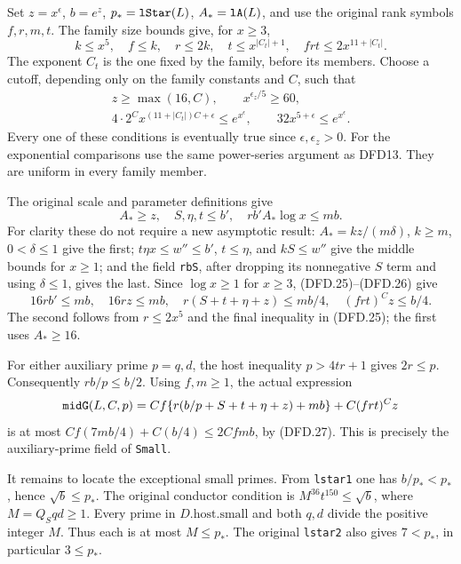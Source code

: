 \documentclass[11pt,a4paper]{article}
\numberwithin{equation}{section}
\theoremstyle{remark}\newtheorem{remark}[theorem]{Remark}
\begin{document}
Set $z=x^\epsilon$, $b=e^z$, $p_*=\texttt{l\allowbreak Star}(L)$,
$A_*=\texttt{l\allowbreak A}(L)$, and use the original rank symbols
$f,r,m,t$. The family size bounds give, for $x\ge3$,
\[
 k\le x^5,\quad f\le k,\quad r\le2k,
 \quad t\le x^{|C_t|+1},\quad
 frt\le2x^{11+|C_t|}.                                  \tag{DFD.24}
\]
The exponent $C_t$ is the one fixed by the family, before
its members. Choose a cutoff, depending only on the
family constants and $C$, such that
\[
 \begin{gathered}
 z\ge\max(16,C),\qquad x^{\epsilon_z/5}\ge60,\\
 4\cdot2^C x^{(11+|C_t|)C+\epsilon}\le e^{x^\epsilon},
 \qquad32x^{5+\epsilon}\le e^{x^\epsilon}.
 \end{gathered}                                         \tag{DFD.25}
\]
Every one of these conditions is eventually true since
$\epsilon,\epsilon_z>0$. For the exponential comparisons
use the same power-series argument as DFD13. They are
uniform in every family member.

The original scale and parameter definitions give
\[
 A_*\ge z,\quad S,\eta,t\le b',\quad
             rb'A_*\log x\le mb.                       \tag{DFD.26}
\]
For clarity these do not require a new asymptotic result:
$A_*=kz/(m\delta)$, $k\ge m$, $0<\delta\le1$ give the
first; $t\eta x\le w''\le b'$, $t\le\eta$, and
$kS\le w''$ give the middle bounds for $x\ge1$; and
the field \texttt{rb\allowbreak S}, after dropping its nonnegative
$S$ term and using $\delta\le1$, gives the last.
Since $\log x\ge1$ for $x\ge3$, (DFD.25)--(DFD.26)
give
\[
 16rb'\le mb,\quad16rz\le mb,\quad
 r(S+t+\eta+z)\le mb/4,\quad(frt)^Cz\le b/4.            \tag{DFD.27}
\]
The second follows from $r\le2x^5$ and the final
inequality in (DFD.25); the first uses $A_*\ge16$.

For either auxiliary prime $p=q,d$, the host inequality
$p>4tr+1$ gives $2r\le p$. Consequently $rb/p\le b/2$.
Using $f,m\ge1$, the actual expression
\[
 \texttt{mid\allowbreak G}(L,C,p)
   =Cf\{r(b/p+S+t+\eta+z)+mb\}+C(frt)^Cz
\]
is at most
$Cf(7mb/4)+C(b/4)\le2Cfmb$, by (DFD.27).
This is precisely the auxiliary-prime field of
\texttt{Small}.

It remains to locate the exceptional small primes. From
\texttt{lstar1} one has $b/p_*<p_*$, hence
$\sqrt b\le p_*$. The original conductor condition is
$M^{36}t^{150}\le\sqrt b$, where $M=Q_Sqd\ge1$.
Every prime in $D.\mathrm{host}.\mathrm{small}$ and
both $q,d$ divide the positive integer $M$. Thus each
is at most $M\le p_*$. The original \texttt{lstar2}
also gives $7<p_*$, in particular $3\le p_*$.
\end{document}
